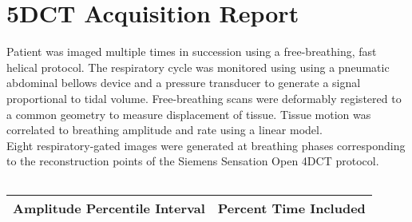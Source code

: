 \documentclass[12pt]{article}
\begin{document}
\section*{5DCT Acquisition Report}


\noindent Patient was imaged multiple times in succession using a
free-breathing, fast helical protocol.  The respiratory cycle was monitored
using using a pneumatic abdominal bellows device and a pressure transducer to
generate a signal proportional to tidal volume.  Free-breathing scans were
deformably registered to a common geometry to measure displacement of tissue.
Tissue motion was correlated to breathing amplitude and rate using a linear
model. \\

\noindent Eight respiratory-gated images were generated at breathing phases
corresponding to the reconstruction points of the Siemens Sensation Open 4DCT protocol.

\medskip


\begin{table}[h!]
	\centering
\begin{tabular}{cc} \toprule
	\midrule

\bottomrule
\end{tabular}
\end{table}

\begin{figure}[h!]
	\centering

\end{figure}
	
\clearpage
\begin{figure}[h!]
	\centering
\end{figure}

\begin{table}[h!]
	\centering
\begin{tabular}{cc} \toprule
Amplitude Percentile Interval & Percent Time Included\\ \midrule


\bottomrule
\end{tabular}
\end{table}
\end{document}
